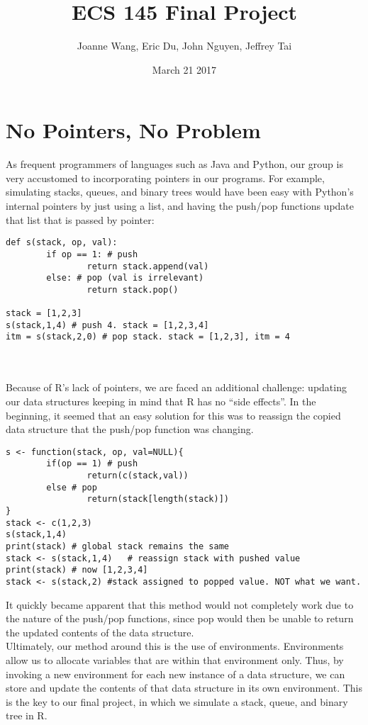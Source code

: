 \documentclass{article}
\title{ECS 145 Final Project}
\author{Joanne Wang, Eric Du, John Nguyen, Jeffrey Tai }
\date{March 21 2017}
\begin{document}
\maketitle

\section{No Pointers, No Problem}
As frequent programmers of languages such as Java and Python, our group is very accustomed to incorporating pointers in our programs. For example, simulating stacks, queues, and binary trees would have been easy with Python’s internal pointers by just using a list, and having the push/pop functions update that list that is passed by pointer:

\begin{lstlisting}
def s(stack, op, val):
	    if op == 1: # push
		        return stack.append(val)
	    else: # pop (val is irrelevant)
		        return stack.pop()

stack = [1,2,3]
s(stack,1,4) # push 4. stack = [1,2,3,4]
itm = s(stack,2,0) # pop stack. stack = [1,2,3], itm = 4
\end{lstlisting}
\\\\Because of R's lack of pointers, we are faced an additional challenge: updating our data structures keeping in mind that R has no ``side effects''. In the beginning, it seemed that an easy solution for this was to reassign the copied data structure that the push/pop function was changing. 

\begin{lstlisting}
s <- function(stack, op, val=NULL){
	    if(op == 1) # push
		        return(c(stack,val))
	    else # pop
		        return(stack[length(stack)])
}
stack <- c(1,2,3)	
s(stack,1,4)
print(stack) # global stack remains the same
stack <- s(stack,1,4)	# reassign stack with pushed value
print(stack) # now [1,2,3,4]
stack <- s(stack,2) #stack assigned to popped value. NOT what we want.

\end{lstlisting}
It quickly became apparent that this method would not completely work due to the nature of the push/pop functions, since pop would then be unable to return the updated contents of the data structure. 
\\Ultimately, our method around this is the use of environments. Environments allow us to allocate variables that are within that environment only. Thus, by invoking a new environment for each new instance of a data structure, we can store and update the contents of that data structure in its own environment. This is the key to our final project, in which we simulate a stack, queue, and binary tree in R.
\end{document}
